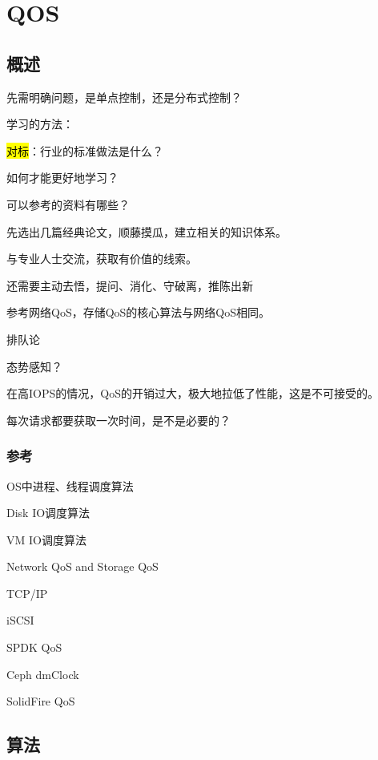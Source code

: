 \chapter{QOS}

\section{概述}

先需明确问题，是单点控制，还是分布式控制？

学习的方法：
\begin{enumbox}
\item \hl{对标}：行业的标准做法是什么？
\item 如何才能更好地学习？
\item 可以参考的资料有哪些？
\item *
\item 先选出几篇经典论文，顺藤摸瓜，建立相关的知识体系。
\item 与专业人士交流，获取有价值的线索。
\item 还需要主动去悟，提问、消化、守破离，推陈出新
\end{enumbox}

参考网络QoS，存储QoS的核心算法与网络QoS相同。

排队论

态势感知？

在高IOPS的情况，QoS的开销过大，极大地拉低了性能，这是不可接受的。

每次请求都要获取一次时间，是不是必要的？

\subsection{参考}

\begin{enumbox}
\item OS中进程、线程调度算法
\item Disk IO调度算法
\item VM IO调度算法
\item Network QoS and Storage QoS
\item TCP/IP
\item iSCSI
\item SPDK QoS
\item Ceph dmClock
\item SolidFire QoS
\end{enumbox}

\section{算法}

